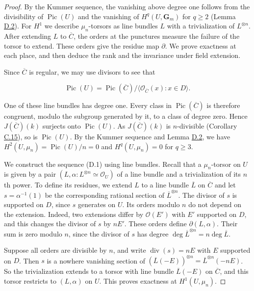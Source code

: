 \documentclass[11pt]{article}
\begin{document}
\begin{proof}[{Proof}]\label{bp187}%
By the Kummer sequence, the vanishing above degree one follows from the divisibility of \(\operatorname{Pic}(U)\) and the vanishing of \(H^q(U,\mathbf G_m)\) for \(q\geq2\) (Lemma \hyperref[bp178]{D.2}). For \(H^1\) we describe \(\mu_n\)-torsors as line bundles \(L\) with a trivialization of \(L^{\otimes n}\). After extending \(L\) to \(\overline C\), the orders at the punctures measure the failure of the torsor to extend. These orders give the residue map \(\partial\). We prove exactness at each place, and then deduce the rank and the invariance under field extension.

Since \(\overline C\) is regular, we may use divisors to see that

\[
\operatorname{Pic}(U)=\operatorname{Pic}(\overline C)/
\langle\mathcal O_{\overline C}(x):x\in D\rangle.
\]

One of these line bundles has degree one. Every class in \(\operatorname{Pic}(\overline C)\) is therefore congruent, modulo the subgroup generated by it, to a class of degree zero. Hence \(J(\overline C)(k)\) surjects onto \(\operatorname{Pic}(U)\). As \(J(\overline C)(k)\) is \(n\)-divisible (Corollary \hyperref[bp163]{C.15}), so is \(\operatorname{Pic}(U)\). By the Kummer sequence and Lemma \hyperref[bp178]{D.2}, we have \(H^2(U,\mu_n)=\operatorname{Pic}(U)/n=0\) and \(H^q(U,\mu_n)=0\) for \(q\geq3\).

We construct the sequence (D.1) using line bundles.  Recall that a \(\mu_n\)-torsor on \(U\) is given by a pair \((L,\alpha:L^{\otimes n}\simeq\mathcal O_U)\) of a line bundle and a trivialization of its \(n\)th power.  To define its residues, we extend \(L\) to a line bundle \(\overline L\) on \(\overline C\) and let \(s=\alpha^{-1}(1)\) be the corresponding rational section of \(\overline L^{\otimes n}\).  The divisor of \(s\) is supported on \(D\), since \(s\) generates on \(U\). Its orders modulo \(n\) do not depend on the extension. Indeed, two extensions differ by \(\mathcal O(E')\) with \(E'\) supported on \(D\), and this changes the divisor of \(s\) by \(nE'\). These orders define \(\partial(L,\alpha)\). Their sum is zero modulo \(n\), since the divisor of \(s\) has degree \(\deg\overline L^{\otimes n}=n\deg\overline L\).

Suppose all orders are divisible by \(n\), and write \(\operatorname{div}(s)=nE\) with \(E\) supported on \(D\). Then \(s\) is a nowhere vanishing section of \((\overline L(-E))^{\otimes n}=\overline L^{\otimes n}(-nE)\). So the trivialization extends to a torsor with line bundle \(\overline L(-E)\) on \(\overline C\), and this torsor restricts to \((L,\alpha)\) on \(U\). This proves exactness at \(H^1(U,\mu_n)\).


\end{proof}
\end{document}
